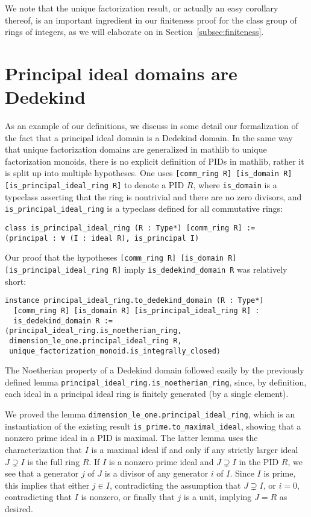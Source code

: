 \documentclass[sn-mathphys]{sn-jnl}%
\newcommand{\lean}[1]{\texttt{#1}\xspace}
\newcommand{\mathlib}{\textsf{mathlib}\xspace}
\begin{document}
We note that the unique factorization result, or actually an easy corollary thereof, is an important ingredient in our finiteness proof for the class group of rings of integers, as we will elaborate on in Section~\ref{subsec:finiteness}.

\section{Principal ideal domains are Dedekind}

As an example of our definitions, we discuss in some detail our formalization of the fact that a principal ideal domain is a Dedekind domain.
In the same way that unique factorization domains are generalized in \mathlib to unique factorization monoids,
there is no explicit definition of PIDs in \mathlib, rather it is split up into multiple hypotheses.
One uses \lean{[comm\_ring R] [is\_domain R] [is\_principal\_ideal\_ring R]} to denote a PID $R$,
where \lean{is\_domain} is a typeclass asserting that the ring is nontrivial and there are no zero divisors,
and \lean{is\_principal\_\-ideal\_\-ring} is a typeclass defined for all commutative rings:
\begin{lstlisting}
class is_principal_ideal_ring (R : Type*) [comm_ring R] :=
(principal : ∀ (I : ideal R), is_principal I)
\end{lstlisting}

Our proof that the hypotheses \lean{[comm\_ring R] [is\_domain R] [is\_principal\_\-ideal\_\-ring R]} imply \lean{is\_dedekind\_domain R} was relatively short:
\begin{lstlisting}
instance principal_ideal_ring.to_dedekind_domain (R : Type*)
  [comm_ring R] [is_domain R] [is_principal_ideal_ring R] :
  is_dedekind_domain R :=
⟨principal_ideal_ring.is_noetherian_ring,
 dimension_le_one.principal_ideal_ring R,
 unique_factorization_monoid.is_integrally_closed⟩
\end{lstlisting}

The Noetherian property of a Dedekind domain followed easily by the previously defined lemma \lean{principal\_ideal\_ring.is\_noetherian\_ring}, since, by definition, each ideal in a principal ideal ring is finitely generated (by a single element).

We proved the lemma \lean{dimension\_le\_one.principal\_ideal\_ring}, which is an instantiation of the existing result \lean{is\_prime.to\_maximal\_ideal}, showing that a nonzero prime ideal in a PID is maximal.
The latter lemma uses the characterization that $I$ is a maximal ideal if and only if any strictly larger ideal $J\supsetneq I$ is the full ring $R$.
If $I$ is a nonzero prime ideal and $J \supsetneq I$ in the PID $R$, we see that a generator $j$ of $J$ is a divisor of any generator $i$ of $I$. Since $I$ is prime, this implies that either $j \in I$, contradicting the assumption that $J \supsetneq I$, or $i = 0$, contradicting that $I$ is nonzero, or finally that $j$ is a unit, implying $J = R$ as desired.
\end{document}
